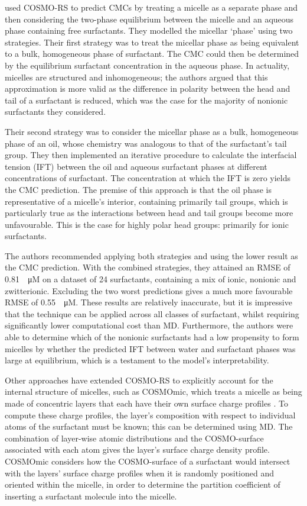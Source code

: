 \citet{turchiFirstprinciplesPredictionCritical2022} used COSMO-RS to predict
CMCs by treating a micelle as a separate phase and then considering the
two-phase equilibrium between the micelle and an aqueous phase containing free
surfactants. They modelled the micellar `phase' using two strategies. Their
first strategy was to treat the micellar phase as being equivalent to a bulk,
homogeneous phase of surfactant. The CMC could then be determined by the
equilibrium surfactant concentration in the aqueous phase. In actuality,
micelles are structured and inhomogeneous; the authors argued that this
approximation is more valid as the difference in polarity between the head and
tail of a surfactant is reduced, which was the case for the majority of nonionic
surfactants they considered.

Their second strategy was to consider the micellar phase as a bulk, homogeneous
phase of an oil, whose chemistry was analogous to that of the surfactant's tail
group. They then implemented an iterative procedure to calculate the interfacial
tension (IFT) between the oil and aqueous surfactant phases at different
concentrations of surfactant. The concentration at which the IFT is zero yields
the CMC prediction. The premise of this approach is that the oil phase is
representative of a micelle's interior, containing primarily tail groups, which
is particularly true as the interactions between head and tail groups become
more unfavourable. This is the case for highly polar head groups: primarily for
ionic surfactants.

The authors recommended applying both strategies and using the lower result as
the CMC prediction. With the combined strategies, they attained an RMSE of
\SI{0.81}{\log \micro M} on a dataset of 24 surfactants, containing a mix of
ionic, nonionic and zwitterionic. Excluding the two worst predictions gives a
much more favourable RMSE of \SI{0.55}{\log \micro M}. These results are
relatively inaccurate, but it is impressive that the technique can be applied
across all classes of surfactant, whilst requiring significantly lower
computational cost than MD. Furthermore, the authors were able to determine
which of the nonionic surfactants had a low propensity to form micelles by
whether the predicted IFT between water and surfactant phases was large at
equilibrium, which is a testament to the model's interpretability.

Other approaches have extended COSMO-RS to explicitly account for the internal
structure of micelles, such as COSMOmic, which treats a micelle as being made of
concentric layers that each have their own surface charge profiles
\cite{klamtCOSMOmicMechanisticApproach2008}. To compute these charge profiles,
the layer's composition with respect to individual atoms of the surfactant must
be known; this can be determined using MD. The combination of layer-wise atomic
distributions and the COSMO-surface associated with each atom gives the layer's
surface charge density profile. COSMOmic considers how the COSMO-surface of a
surfactant would intersect with the layers' surface charge profiles when it is
randomly positioned and oriented within the micelle, in order to determine the
partition coefficient of inserting a surfactant molecule into the micelle.

